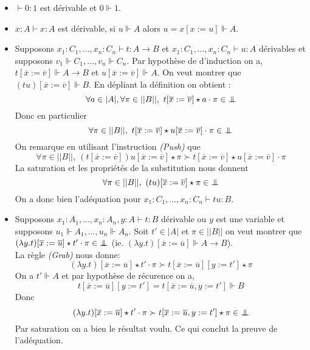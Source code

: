 \documentclass[a4paper,12pt]{article}
\theoremstyle{rmqstyle}
\newcommand{\abs}[1]{\lvert#1\rvert}
\newcommand{\abss}[1]{\lvert \lvert#1\rvert \rvert}
\newcommand{\pole}{{\protect\mathpalette{\protect\polehelper}{\bot}}} \def\polehelper#1#2{\mathrel{\rlap{$#1#2$}\mkern3mu{#1#2}}}
\renewcommand{\bar}{\overline}
\begin{document}
\begin{itemize}
\setlength\itemsep{ -1 em}
\item $\vdash 0 : 1$ est dérivable et $0 \Vdash 1$.\\

\item $x : A \vdash x :A$ est dérivable, si $u \Vdash A$ alors $u = x[x := u] \Vdash A$.\\

\item Supposons $x_1 : C_1, \dots, x_n : C_n \vdash t : A \to B$ et $x_1 : C_1, \dots, x_n : C_n \vdash u : A$ dérivables et supposons $v_1 \Vdash C_1, \dots, v_n \Vdash C_n$. Par hypothèse de d'induction on a, $t[ \bar{x} := \bar{v}] \Vdash A \to B$ et $u[\bar{x} := \bar{v}] \Vdash A$. On veut montrer que $(tu)[\bar{x} := \bar{v}] \Vdash B$. En dépliant la définition on obtient : 
$$\forall a \in \abs{A}, \forall \pi \in \abss{B}, \ t[\bar{x} := \bar{v}] \star a \cdot \pi \in \pole$$
Donc en particulier
$$ \forall \pi \in \abss{B}, \ t[\bar{x} := \bar{v}] \star u[\bar{x} := \bar{v}] \cdot \pi \in \pole$$
On remarque en utilisant l'instruction \textit{(Push)} que 
$$\forall \pi \in \abss{B}, \ (t[\bar{x} := \bar{v}])u[\bar{x} := \bar{v}] \star \pi \succ t[\bar{x} := \bar{v}] \star u[\bar{x} := \bar{v}] \cdot \pi$$
La saturation et les propriétés de la substitution nous donnent 
$$\forall \pi \in \abss{B}, \ (tu)[\bar{x} := \bar{v}] \star \pi \in \pole$$
On a donc bien l'adéquation pour $x_1 : C_1, \dots, x_n : C_n \vdash tu : B$.\\

\item Supposons $x_1 : A_1, \dots, x_n : A_n, y : A \vdash t : B$ dérivable ou $y$ est une variable et supposons $u_1 \Vdash A_1, \dots, u_n \Vdash A_n$. Soit $t' \in \abs{A}$ et $\pi \in \abss{B}$ on veut montrer que $(\lambda y.t)[\bar{x} := \bar{u}] \star t' \cdot \pi \in \pole$ (ie. $(\lambda y.t)[\bar{x} := \bar{u}] \Vdash A \to B$).\\
La règle \textit{(Grab)} nous donne:
$$(\lambda y.t)[\bar{x} := \bar{u}] \star t' \cdot \pi \succ  t[\bar{x} := \bar{u}][y := t'] \star \pi $$
On a $t' \Vdash A$ et par hypothèse de récurence on a,
$$t[\bar{x} := \bar{u}][y := t'] = t[\bar{x} := \bar{u}, y := t'] \Vdash B$$
Donc
$$(\lambda y.t)[\bar{x} := \bar{u}] \star t' \cdot \pi \succ  t[\bar{x} := \bar{u}, y := t'] \star \pi \in \pole$$
Par saturation on a bien le résultat voulu. Ce qui conclut la preuve de l'adéquation.
\end{itemize}
\end{document}
